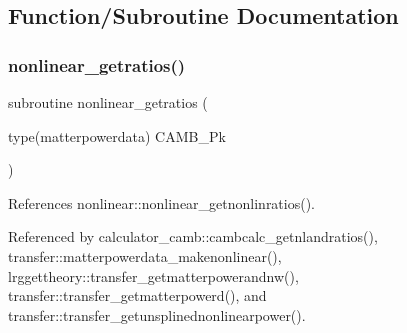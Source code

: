 \subsection{Function/\+Subroutine Documentation}
\mbox{\label{halofit__ppf_8f90_aa86a98d6430a2409729002ab053ce60c}} 
\subsubsection{\texorpdfstring{nonlinear\+\_\+getratios()}{nonlinear\_getratios()}}
{\footnotesize\ttfamily subroutine nonlinear\+\_\+getratios (\begin{DoxyParamCaption}\item[{type(matterpowerdata)}]{C\+A\+M\+B\+\_\+\+Pk }\end{DoxyParamCaption})\hspace{0.3cm}{\ttfamily [private]}}



References nonlinear\+::nonlinear\+\_\+getnonlinratios().



Referenced by calculator\+\_\+camb\+::cambcalc\+\_\+getnlandratios(), transfer\+::matterpowerdata\+\_\+makenonlinear(), lrggettheory\+::transfer\+\_\+getmatterpowerandnw(), transfer\+::transfer\+\_\+getmatterpowerd(), and transfer\+::transfer\+\_\+getunsplinednonlinearpower().

